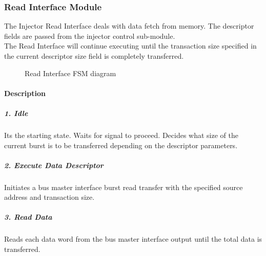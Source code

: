 \subsubsection{Read Interface Module}
The Injector Read Interface deals with data fetch from memory. The descriptor fields are passed from the injector control sub-module.\\
The Read Interface will continue executing until the transaction size specified in the current descriptor size field is completely transferred.\\

\begin{figure}[ht]
	\centering
	\caption{Read Interface FSM diagram}
	\label{fig:read_states}
\end{figure}

\paragraph{Description}
\subparagraph{1. Idle}
Its the starting state. Waits for  signal to proceed. Decides what size of the current burst is to be transferred depending on the descriptor parameters.

\subparagraph{2. Execute Data Descriptor}
Initiates a bus master interface burst read transfer with the specified source address and transaction size.

\subparagraph{3. Read Data}
Reads each data word from the bus master interface output until the total data is transferred.\\
\vspace{1cm}